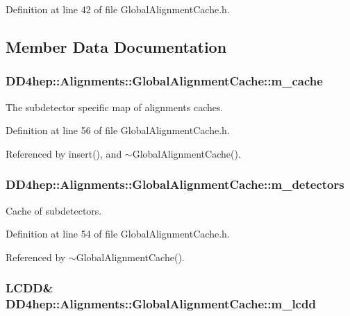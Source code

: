 Definition at line 42 of file GlobalAlignmentCache.h.

\subsection{Member Data Documentation}
\hypertarget{class_d_d4hep_1_1_alignments_1_1_global_alignment_cache_a00b2ed5078af798d881bf59d8a30bed3}{
\subsubsection[{m\_\-cache}]{ {\bf DD4hep::Alignments::GlobalAlignmentCache::m\_\-cache}}}
\label{class_d_d4hep_1_1_alignments_1_1_global_alignment_cache_a00b2ed5078af798d881bf59d8a30bed3}


The subdetector specific map of alignments caches. 

Definition at line 56 of file GlobalAlignmentCache.h.

Referenced by insert(), and $\sim$GlobalAlignmentCache().\hypertarget{class_d_d4hep_1_1_alignments_1_1_global_alignment_cache_abf497ee00ee5dbe22b05c75041c0e2c8}{
\subsubsection[{m\_\-detectors}]{ {\bf DD4hep::Alignments::GlobalAlignmentCache::m\_\-detectors}}}
\label{class_d_d4hep_1_1_alignments_1_1_global_alignment_cache_abf497ee00ee5dbe22b05c75041c0e2c8}


Cache of subdetectors. 

Definition at line 54 of file GlobalAlignmentCache.h.

Referenced by $\sim$GlobalAlignmentCache().\hypertarget{class_d_d4hep_1_1_alignments_1_1_global_alignment_cache_af1d0806e8ffced7c5d0f1438f58a6133}{
\subsubsection[{m\_\-lcdd}]{\setlength{\rightskip}{0pt plus 5cm}LCDD\& {\bf DD4hep::Alignments::GlobalAlignmentCache::m\_\-lcdd}}}
\label{class_d_d4hep_1_1_alignments_1_1_global_alignment_cache_af1d0806e8ffced7c5d0f1438f58a6133}


